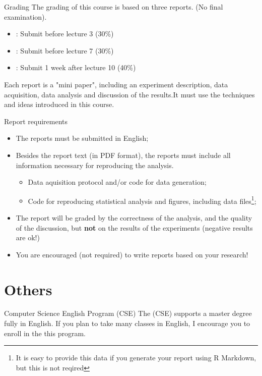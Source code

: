 \documentclass{beamer}
\begin{document}
\begin{CJK}{UTF8}{ipxm}
\begin{frame}{Grading}
  The grading of this course is based on three reports. (No final examination).
  \bigskip

  \begin{itemize}
    \item {}: Submit before lecture 3 (30\%)
    \item {}: Submit before lecture 7 (30\%)
    \item {}: Submit 1 week after lecture 10 (40\%)
  \end{itemize}
  \bigskip

  Each report is a "mini paper", including an experiment description, data acquisition, data analysis and discussion of the results.It must use the techniques and ideas introduced in this course.
\end{frame}

\begin{frame}{Report requirements}
  \begin{itemize}
    \item The reports must be submitted in English;\medskip

    \item Besides the report text (in PDF format), the reports must include all information necessary for reproducing the analysis.
    \begin{itemize}
      \item Data aquisition protocol and/or code for data generation;
      \item Code for reproducing statistical analysis and figures, including data files\footnote{It is easy to provide this data if you generate your report using R Markdown, but this is not reqired};
    \end{itemize}\medskip

    \item The report will be graded by the correctness of the analysis, and the quality of the discussion, but {\bf not} on the results of the experiments (negative results are ok!)\medskip

    \item You are encouraged (not required) to write reports based on your research!
  \end{itemize}

\end{frame}

\section{Others}
\begin{frame}{Computer Science English Program (CSE)}
  The (CSE) supports a master degree fully in English. If you plan to take many classes in English, I encourage you to enroll in the this program.
  \bigskip


\end{frame}
\end{CJK}
\end{document}
